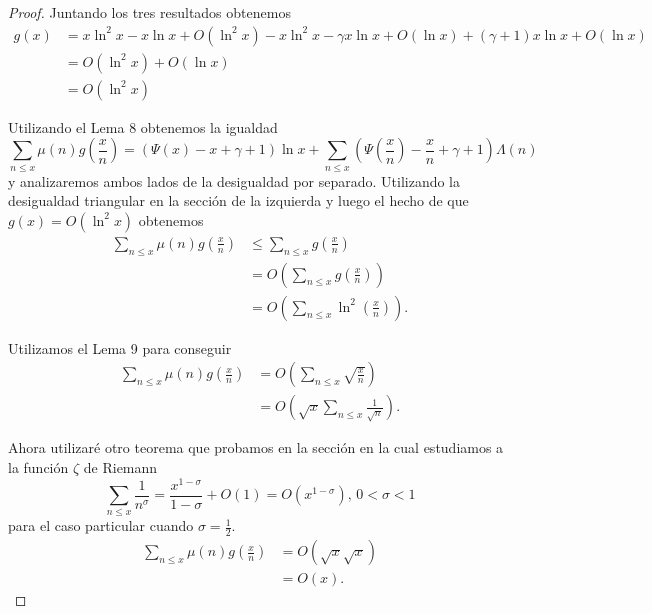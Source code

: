 \documentclass{article}
\theoremstyle{definition}
\theoremstyle{remark}
\begin{document}
\begin{proof}
Juntando los tres resultados obtenemos
\begin{align*}
g(x) &= x \ln^2 x - x \ln x + O(\ln^2 x) - x \ln^2 x - \gamma x \ln x + O(\ln x) + (\gamma + 1) x \ln x + O(\ln x) \\
&= O(\ln^2 x) + O(\ln x) \\
&= O(\ln^2 x)
\end{align*}

Utilizando el Lema 8 obtenemos la igualdad
$$\sum_{n \leq x} \mu(n) g\left(\frac{x}{n}\right) = (\Psi(x) - x + \gamma + 1) \ln x + \sum_{n \leq x} \left(\Psi\left(\frac{x}{n}\right) - \frac{x}{n} + \gamma + 1\right) \Lambda(n)$$
y analizaremos ambos lados de la desigualdad por separado.
Utilizando la desigualdad triangular en la secci\'on de la izquierda y luego el hecho de que $g(x) = O(\ln^2 x)$ obtenemos
\begin{align*}
\sum_{n \leq x} \mu(n) g\left(\frac{x}{n}\right) &\leq \sum_{n \leq x} g\left(\frac{x}{n}\right) \\
&= O\left(\sum_{n \leq x} g\left(\frac{x}{n}\right)\right) \\
&= O\left(\sum_{n \leq x} \ln^2 \left(\frac{x}{n}\right)\right).
\end{align*}

Utilizamos el Lema 9 para conseguir
\begin{align*}
\sum_{n \leq x} \mu(n) g\left(\frac{x}{n}\right) &= O\left(\sum_{n \leq x} \sqrt{\frac{x}{n}}\right) \\
&= O\left(\sqrt{x} \sum_{n \leq x} \frac{1}{\sqrt{n}}\right).
\end{align*}

Ahora utilizar\'e otro teorema que probamos en la secci\'on en la cual estudiamos a la funci\'on $\zeta$ de Riemann
$$\sum_{n \leq x} \frac{1}{n^\sigma} = \frac{x^{1 - \sigma}}{1 - \sigma} + O(1) = O(x ^ {1 - \sigma}), \, 0 < \sigma < 1$$
para el caso particular cuando $\sigma = \frac{1}{2}$.
\begin{align*}
\sum_{n \leq x} \mu(n) g\left(\frac{x}{n}\right) &= O(\sqrt{x}\sqrt{x}) \\
&= O(x).
\end{align*}


\end{proof}
\end{document}
